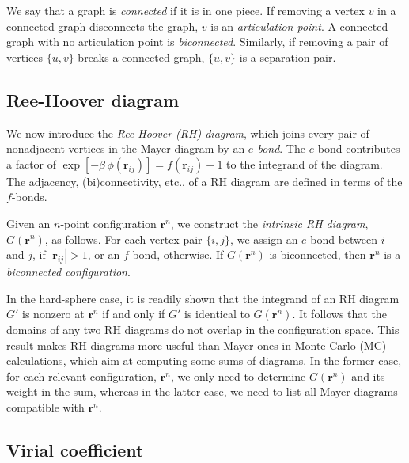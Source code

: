 \documentclass[aip,jcp,preprint,superscriptaddress,showpacs,preprintnumbers,amsmath,amssymb]{revtex4-1}
\numberwithin{equation}{section}
\newcommand{\vct}[1]{\mathbf{#1}}
\providecommand{\vr}{} %
\renewcommand{\vr}{\vct{r}}
\begin{document}
We say that a graph is \emph{connected} if it is in one piece.
%
If removing a vertex $v$ in a connected graph
disconnects the graph,
$v$ is an \emph{articulation point}.
%
A connected graph with no articulation point
is \emph{biconnected}.
%
Similarly, if removing a pair of vertices $\{u, v\}$
breaks a connected graph,
$\{u, v\}$ is a separation pair.





\subsection{Ree-Hoover diagram}




We now introduce the \emph{Ree-Hoover (RH) diagram},
which joins every pair of nonadjacent vertices
in the Mayer diagram by an \emph{$e$-bond}.
%
The $e$-bond contributes a factor of
$\exp[-\beta\, \phi(\vr_{ij})] = f(\vr_{ij}) + 1$
to the integrand of the diagram.
%
The adjacency, (bi)connectivity, etc.,
of a RH diagram are defined in terms of the $f$-bonds.



Given an $n$-point configuration $\vr^n$,
we construct the \emph{intrinsic RH diagram},
$G(\vr^n)$, as follows.
%
For each vertex pair $\{i, j\}$,
we assign an $e$-bond between $i$ and $j$,
if $|\vr_{ij}| > 1$, or an $f$-bond, otherwise.
%
If $G(\vr^n)$ is biconnected,
then $\vr^n$ is a \emph{biconnected configuration}.



In the hard-sphere case,
it is readily shown that the integrand of an RH diagram
$G'$ is nonzero at $\vr^n$
if and only if $G'$ is identical to $G(\vr^n)$.
%
It follows that the domains of any two RH diagrams
do not overlap in the configuration space.
%
This result makes RH diagrams more useful than Mayer ones
in Monte Carlo (MC) calculations,
which aim at computing some sums of diagrams.
%
In the former case,
for each relevant configuration, $\vr^n$,
we only need to determine $G(\vr^n)$
and its weight in the sum,
whereas in the latter case,
we need to list all Mayer diagrams compatible with $\vr^n$.





\subsection{Virial coefficient}
\end{document}
